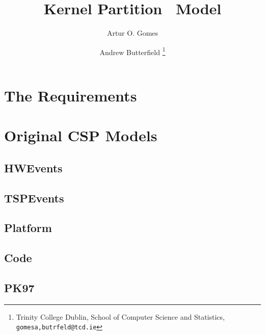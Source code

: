\documentclass{report}
\begin{document}
\title{Kernel Partition \Circus\ Model}

\author{%
  Artur O. Gomes
  \and
  Andrew Butterfield
\thanks{%
  Trinity College Dublin,
  School of Computer Science and Statistics,
  \texttt{gomesa,butrfeld@tcd.ie}
}
}

\maketitle

\tableofcontents




\appendix

\chapter{The Requirements}



\chapter{Original CSP Models}

\section{HWEvents}


\newpage
\section{TSPEvents}


\newpage
\section{Platform}


\newpage
\section{Code}


\newpage
\section{PK97}

\end{document}
